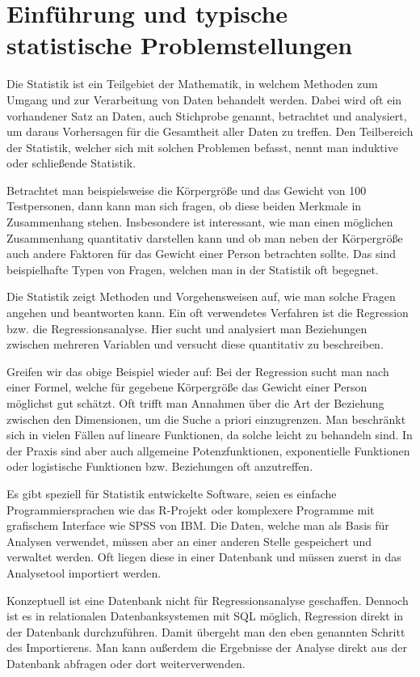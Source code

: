 \chapter{Einführung und typische statistische Problemstellungen}
\label{chapter:1}

Die Statistik ist ein Teilgebiet der Mathematik, in welchem Methoden zum Umgang und zur Verarbeitung von Daten behandelt werden. Dabei wird oft ein vorhandener Satz an Daten, auch Stichprobe genannt, betrachtet und analysiert, um daraus Vorhersagen für die Gesamtheit aller Daten zu treffen. Den Teilbereich der Statistik, welcher sich mit solchen Problemen befasst, nennt man induktive oder schließende Statistik.

Betrachtet man beispielsweise die Körpergröße und das Gewicht von 100 Testpersonen, dann kann man sich fragen, ob diese beiden Merkmale in Zusammenhang stehen. Insbesondere ist interessant, wie man einen möglichen Zusammenhang quantitativ darstellen kann und ob man neben der Körpergröße auch andere Faktoren für das Gewicht einer Person betrachten sollte. Das sind beispielhafte Typen von Fragen, welchen man in der Statistik oft begegnet.

Die Statistik zeigt Methoden und Vorgehensweisen auf, wie man solche Fragen angehen und beantworten kann. Ein oft verwendetes Verfahren ist die Regression bzw. die Regressionsanalyse. Hier sucht und analysiert man Beziehungen zwischen mehreren Variablen und versucht diese quantitativ zu beschreiben.

Greifen wir das obige Beispiel wieder auf: Bei der Regression sucht man nach einer Formel, welche für gegebene Körpergröße das Gewicht einer Person möglichst gut schätzt. Oft trifft man Annahmen über die Art der Beziehung zwischen den Dimensionen, um die Suche a priori einzugrenzen. Man beschränkt sich in vielen Fällen auf lineare Funktionen, da solche leicht zu behandeln sind. In der Praxis sind aber auch allgemeine Potenzfunktionen, exponentielle Funktionen oder logistische Funktionen bzw. Beziehungen oft anzutreffen.

Es gibt speziell für Statistik entwickelte Software, seien es einfache Programmiersprachen wie das R-Projekt oder komplexere Programme mit grafischem Interface wie SPSS von IBM. Die Daten, welche man als Basis für Analysen verwendet, müssen aber an einer anderen Stelle gespeichert und verwaltet werden. Oft liegen diese in einer Datenbank und müssen zuerst in das Analysetool importiert werden.

Konzeptuell ist eine Datenbank nicht für Regressionsanalyse geschaffen. Dennoch ist es in relationalen Datenbanksystemen mit SQL möglich, Regression direkt in der Datenbank durchzuführen. Damit übergeht man den eben genannten Schritt des Importierens. Man kann außerdem die Ergebnisse der Analyse direkt aus der Datenbank abfragen oder dort weiterverwenden.

